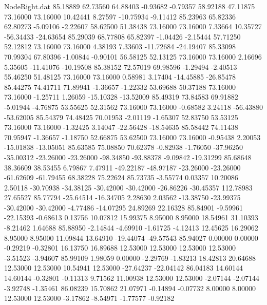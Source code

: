 \begin{filecontents}{NodeRight.dat}
  85.18889   62.73560   64.88403    -0.93682   -0.79357   58.92188   47.11875   73.16000   73.16000   10.42441    8.27597  -10.75934   -9.11412
  85.23963   65.82336   62.80273    -5.09106   -2.22607   58.62500   51.38438   73.16000   73.16000    7.33664   10.35727  -56.34433  -24.63654
  85.29039   68.77808   65.82397    -1.04426   -2.15444   57.71250   52.12812   73.16000   73.16000    4.38193    7.33603  -11.72684  -24.19407
  85.33098   70.99304   67.80396    -1.00844   -0.90101   56.58125   52.13125   73.16000   73.16000    2.16696    5.35605  -11.41076  -10.19508
  85.38152   72.57019   69.98596    -1.29494   -2.40513   55.46250   51.48125   73.16000   73.16000    0.58981    3.17404  -14.45885  -26.85478
  85.44275   74.41711   71.89941    -1.36657   -1.22332   53.69688   50.37188   73.16000   73.16000   -1.25711    1.26059  -15.10328  -13.52009
  85.49319   73.84583   69.91882    -5.01944   -4.76875   53.55625   52.31562   73.16000   73.16000   -0.68582    3.24118  -56.43880  -53.62005
  85.54379   74.48425   70.01953    -2.01119   -1.65307   52.83750   53.53125   73.16000   73.16000   -1.32425    3.14047  -22.56428  -18.54635
  85.58442   74.11438   70.95947    -1.36657   -1.18750   52.66875   53.62500   73.16000   73.16000   -0.95438    2.20053  -15.01838  -13.05051
  85.63585   75.08850   70.62378    -0.82938   -1.76050  -37.96250  -35.00312  -23.26000  -23.26000  -98.34850  -93.88378   -9.09842  -19.31299
  85.68648   38.36609   38.53455     6.79867    7.47911  -49.22187  -48.97187  -23.26000  -23.26000  -61.62609  -61.79455   68.38228   75.22624
  85.73735   -3.55774    0.03357    10.20086    2.50118  -30.70938  -34.38125  -30.42000  -30.42000  -26.86226  -30.45357  112.78983   27.65527
  85.77794  -25.64514  -16.34705     2.28630    2.03562  -13.38750  -23.99375  -30.42000  -30.42000   -4.77486  -14.07295   24.89269   22.16328
  85.84901   -9.59961  -22.15393    -0.68613    0.13756   10.07812   15.99375    8.95000    8.95000   18.54961   31.10393   -8.21462    1.64688
  85.88950   -2.14844   -4.69910    -1.61725   -4.12413   12.45625   16.29062    8.95000    8.95000   11.09844   13.64910  -19.44074  -49.57543
  85.94027    0.00000    0.00000    -0.29219   -0.32801   16.13750   16.89688   12.53000   12.53000   12.53000   12.53000   -3.51523   -3.94607
  85.99109    1.98059    0.00000    -2.29769   -1.83213   18.42813   20.64688   12.53000   12.53000   10.54941   12.53000  -27.64237  -22.04142
  86.04183   14.60144   14.60144    -0.32801   -0.11313    9.71562   11.00938   12.53000   12.53000   -2.07144   -2.07144   -3.92748   -1.35461
  86.08239   15.70862   21.07971    -0.14894   -0.07732    8.00000    8.00000   12.53000   12.53000   -3.17862   -8.54971   -1.77577   -0.92182

\end{filecontents}
